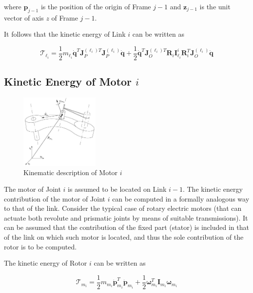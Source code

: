 \documentclass[10pt]{article}
\begin{document}
where $\boldsymbol{p}_{j-1}$ is the position  of the origin of Frame $j-1$ and $\boldsymbol{z}_{j-1}$ is the unit vector of axis $z$ of Frame $j-1$. 



It follows that the kinetic energy of Link $i$ can be written as

$$
\mathcal{T}_{\ell_{i}}=\frac{1}{2} m_{\ell_{i}} \dot{\boldsymbol{q}}^{T} \boldsymbol{J}_{P}^{\left(\ell_{i}\right) T} \boldsymbol{J}_{P}^{\left(\ell_{i}\right)} \dot{\boldsymbol{q}}+\frac{1}{2} \dot{\boldsymbol{q}}^{T} \boldsymbol{J}_{O}^{\left(\ell_{i}\right) T} \boldsymbol{R}_{i} \boldsymbol{I}_{\ell_{i}}^{i} \boldsymbol{R}_{i}^{T} \boldsymbol{J}_{O}^{\left(\ell_{i}\right)} \dot{\boldsymbol{q}}
$$

\subsection{Kinetic Energy of Motor $i$}


\begin{figure}[H]
    \centering
    \includegraphics[max width=0.35\textwidth]{dynamics/motori_kinematics.jpg}
    \caption{Kinematic description of Motor $i$}
    \label{fig:enter-label}
\end{figure}




The motor of Joint $i$ is assumed to be located on Link $i-1$. The kinetic energy contribution of the motor of Joint $i$ can be computed in a formally analogous way to that of the link. Consider the typical case of rotary electric motors (that can actuate both revolute and prismatic joints by means of suitable transmissions). It can be assumed that the contribution of the fixed part (stator) is included in that of the link on which such motor is located, and thus the sole contribution of the rotor is to be computed.

The kinetic energy of Rotor $i$ can be written as

$$
\mathcal{T}_{m_{i}}=\frac{1}{2} m_{m_{i}} \dot{\boldsymbol{p}}_{m_{i}}^{T} \dot{\boldsymbol{p}}_{m_{i}}+\frac{1}{2} \boldsymbol{\omega}_{m_{i}}^{T} \boldsymbol{I}_{m_{i}} \boldsymbol{\omega}_{m_{i}}
$$
\end{document}
